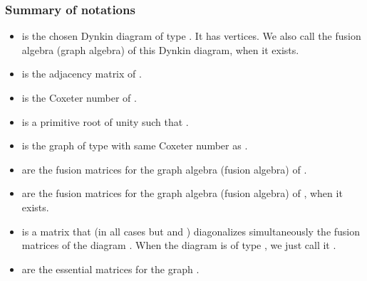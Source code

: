 \documentclass[a4paper,11pt]{article}
\begin{document}
\eject

\subsubsection{Summary of notations}
\begin{itemize}

\item   {}\coordHE{} is the chosen Dynkin diagram of type \coordHE{}. It has \coordHE{}
vertices. We also call \coordHE{} the fusion algebra (graph algebra) of this
Dynkin diagram, when it exists.

\item  {}\coordHE{}  is the adjacency matrix of \coordHE{}.

\item  \myHighlight{${\kappa }$}\coordHE{} is the Coxeter number of \coordHE{}.

\item  {}\coordHE{} is a primitive root of unity such that \coordHE{}.

\item  {}\coordHE{} is the graph of type \coordHE{} with same Coxeter number
\myHighlight{$\kappa$}\coordHE{} as \coordHE{}.

\item  {}\coordHE{} are the fusion matrices for the graph algebra
(fusion algebra) of \coordHE{}.

\item  {}\coordHE{} are the fusion matrices for the graph algebra
(fusion algebra) of \coordHE{}, when it exists.

\item {}\coordHE{} is a \coordHE{} matrix that (in all cases but \coordHE{}
and \coordHE{}) diagonalizes simultaneously the \coordHE{} fusion matrices \coordHE{}
of the diagram \coordHE{}. When the diagram \coordHE{} is of type \coordHE{}, we just call
it \coordHE{}.

\item  {}\coordHE{} are the essential matrices for the graph
\coordHE{}.


\end{itemize}
\end{document}
